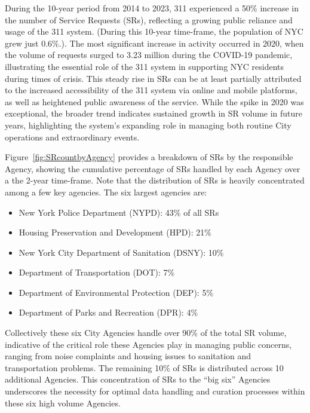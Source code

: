 \documentclass[linenumber]{jdsart}
\begin{document}
During the 10\mbox{-}year period from 2014 to 2023,  311 experienced
a 50\% increase in the number of Service Requests (SRs), 
reflecting a growing public reliance and usage of 
the 311 system. (During this 10\mbox{-}year time-frame, the 
population of NYC grew just 0.6\%.). The most significant increase
in activity occurred in 2020, when the volume of requests 
surged to 3.23 million during the COVID\mbox{-}19 pandemic, 
illustrating the essential role of the 311 system in supporting 
NYC residents during times of crisis. This steady 
rise in SRs can be at least partially attributed to the increased 
accessibility of the 311 system via online and mobile 
platforms, as well as heightened public awareness of the service. 
While the spike in 2020 was exceptional, the broader trend 
indicates sustained growth in SR volume in future years,  
highlighting the system's expanding role in managing 
both routine City operations and extraordinary events.

Figure~\ref{fig:SRcountbyAgency} provides a breakdown of SRs by
the responsible Agency, showing the cumulative 
percentage of SRs handled by each
Agency over a the 2\mbox{-}year time-frame. Note that the
distribution of SRs is heavily concentrated among a few key 
agencies. The six largest agencies are:

\begin{itemize}[left=1.5em]
    \item New York Police Department (NYPD): 43\% of all SRs
    \item Housing Preservation and Development (HPD): 21\%
    \item New York City Department of Sanitation (DSNY): 10\%
    \item Department of Transportation (DOT): 7\%
    \item Department of Environmental Protection (DEP): 5\%
    \item Department of Parks and Recreation (DPR): 4\%
\end{itemize}

Collectively these six City Agencies handle over 90\% of the total SR 
volume, indicative of the critical role these Agencies play in managing
public concerns, ranging from noise complaints and housing issues to
sanitation and transportation problems. The remaining
10\% of SRs is distributed across 10 additional Agencies. 
This concentration of SRs to the ``big six'' Agencies 
underscores the necessity for optimal data handling and 
curation processes within these six high volume Agencies.
\end{document}
